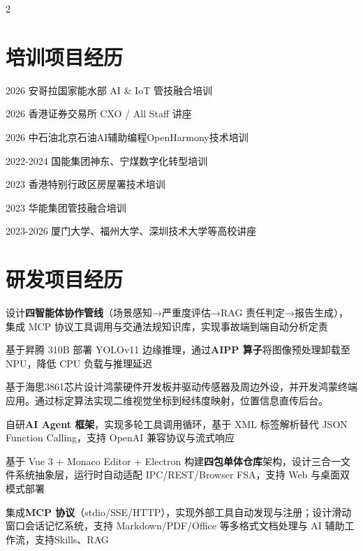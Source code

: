 \documentclass[]{deedy-resume-openfont}
\begin{document}
\begin{paracol}{2}

\section{培训项目经历}

\sectionsep

\begin{tightemize}
    \item 2026 安哥拉国家能水部 AI \& IoT 管技融合培训
    \item 2026 香港证券交易所 CXO / All Staff 讲座
    \item 2026 中石油北京石油AI辅助编程OpenHarmony技术培训
    \item 2022-2024 国能集团神东、宁煤数字化转型培训
    \item 2023 香港特别行政区房屋署技术培训
    \item 2023 华能集团管技融合培训
    \item 2023-2026 厦门大学、福州大学、深圳技术大学等高校讲座
\end{tightemize}
\sectionsep

\section{研发项目经历}

\begin{tightemize}
    \item 设计\textbf{四智能体协作管线}（场景感知→严重度评估→RAG 责任判定→报告生成），集成 MCP 协议工具调用与交通法规知识库，实现事故端到端自动分析定责
    \item 基于昇腾 310B 部署 YOLOv11 边缘推理，通过\textbf{AIPP 算子}将图像预处理卸载至 NPU，降低 CPU 负载与推理延迟
    \item 基于海思3861芯片设计鸿蒙硬件开发板并驱动传感器及周边外设，并开发鸿蒙终端应用。通过标定算法实现二维视觉坐标到经纬度映射，位置信息直传后台。
\end{tightemize}
\sectionsep

\begin{tightemize}
    \item 自研\textbf{AI Agent 框架}，实现多轮工具调用循环，基于 XML 标签解析替代 JSON Function Calling，支持 OpenAI 兼容协议与流式响应
    \item 基于 Vue 3 + Monaco Editor + Electron 构建\textbf{四包单体仓库}架构，设计三合一文件系统抽象层，运行时自动适配 IPC/REST/Browser FSA，支持 Web 与桌面双模式部署
    \item 集成\textbf{MCP 协议}（stdio/SSE/HTTP），实现外部工具自动发现与注册；设计滑动窗口会话记忆系统，支持 Markdown/PDF/Office 等多格式文档处理与 AI 辅助工作流，支持Skills、RAG
\end{tightemize}
\sectionsep


\end{paracol}
\end{document}
